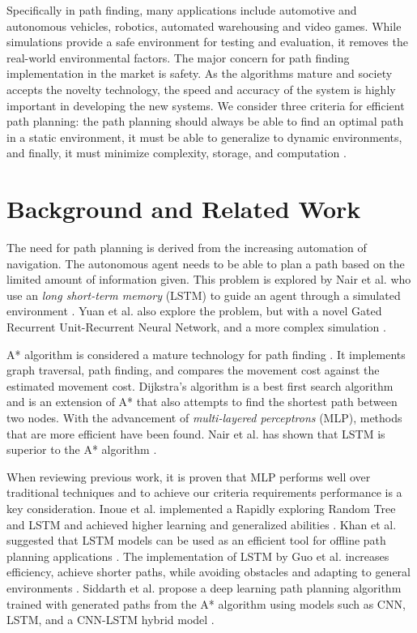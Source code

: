 \documentclass[conference]{IEEEtran}
\begin{document}
Specifically in path finding, many applications include automotive and
autonomous vehicles, robotics, automated warehousing and video games. While
simulations provide a safe environment for testing and evaluation, it removes
the real-world environmental factors. The major concern for path finding
implementation in the market is safety. As the algorithms mature and society
accepts the novelty technology, the speed and accuracy of the system is highly
important in developing the new systems. We consider three criteria for
efficient path planning: the path planning should always be able to find an
optimal path in a static environment, it must be able to generalize to dynamic
environments, and finally, it must minimize complexity, storage, and computation
\cite{janet_essential_1995}.

\section{Background and Related Work}
The need for path planning is derived from the increasing automation of
navigation. The autonomous agent needs to be able to plan a path based on the
limited amount of information given. This problem is explored by Nair et al. who
use an \textit{long short-term memory} (LSTM) to guide an agent through a
simulated environment \cite{nair_robotic_2020}. Yuan et al. also explore the
problem, but with a novel Gated Recurrent Unit-Recurrent Neural Network, and a
more complex simulation \cite{yuan_novel_2019}.

A* algorithm is considered a mature technology for path finding
\cite{hart_formal_1968}. It implements graph traversal, path finding, and
compares the movement cost against the estimated movement cost. Dijkstra's
algorithm is a best first search algorithm and is an extension of A* that also
attempts to find the shortest path between two nodes. With the advancement of
\textit{multi-layered perceptrons} (MLP), methods that are more efficient have
been found. Nair et al. has shown that LSTM is superior to the A* algorithm
\cite{nair_robotic_2020}.

When reviewing previous work, it is proven that MLP performs well over
traditional techniques and to achieve our criteria requirements performance is a
key consideration. Inoue et al. implemented a Rapidly exploring Random Tree and
LSTM and achieved higher learning and generalized abilities
\cite{inoue_robot_2019}. Khan et al. suggested that LSTM models can be used as
an efficient tool for offline path planning applications \cite{khan_using_2017}.
The implementation of LSTM by Guo et al. increases efficiency, achieve shorter
paths, while avoiding obstacles and adapting to general environments
\cite{guo_fusion_2021}. Siddarth et al. propose a deep learning path planning
algorithm trained with generated paths from the A* algorithm using models such
as CNN, LSTM, and a CNN-LSTM hybrid model \cite{siddarth_path_2021}.
\end{document}
